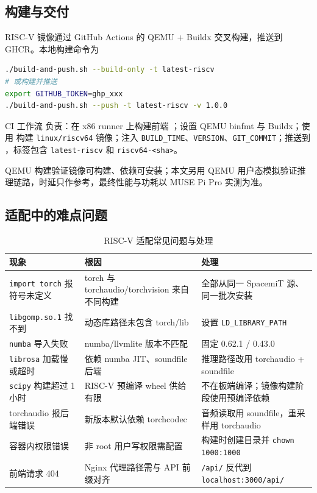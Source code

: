 \documentclass[UTF8,11pt,a4paper,fontset=none]{ctexart}
\begin{document}
\subsection{构建与交付}

RISC-V 镜像通过 GitHub Actions 的 QEMU + Buildx 交叉构建，推送到 GHCR。本地构建命令为

\begin{lstlisting}[language=bash,caption={RISC-V 镜像构建命令},label={lst:build}]
./build-and-push.sh --build-only -t latest-riscv
# 或构建并推送
export GITHUB_TOKEN=ghp_xxx
./build-and-push.sh --push -t latest-riscv -v 1.0.0
\end{lstlisting}

CI 工作流  负责：在 x86 runner 上构建前端 ；设置 QEMU binfmt 与 Buildx；使用  构建 \texttt{linux/riscv64} 镜像；注入 \texttt{BUILD\_TIME}、\texttt{VERSION}、\texttt{GIT\_COMMIT}；推送到 ，标签包含 \texttt{latest-riscv} 和 \texttt{riscv64-<sha>}。

QEMU 构建验证镜像可构建、依赖可安装；本文另用 QEMU 用户态模拟验证推理链路，时延只作参考，最终性能与功耗以 MUSE Pi Pro 实测为准。

\subsection{适配中的难点问题}

\begin{table}[H]
\centering
\small
\caption{RISC-V 适配常见问题与处理}
\label{tab:pitfalls}
\begin{tabular}{p{4.4cm}p{4.6cm}p{5.0cm}}
\toprule
现象 & 根因 & 处理 \\
\midrule
\texttt{import torch} 报符号未定义 & torch 与 torchaudio/torchvision 来自不同构建 & 全部从同一 SpacemiT 源、同一批次安装 \\
\texttt{libgomp.so.1} 找不到 & 动态库路径未包含 torch/lib & 设置 \texttt{LD\_LIBRARY\_PATH} \\
\texttt{numba} 导入失败 & numba/llvmlite 版本不匹配 & 固定 0.62.1 / 0.43.0 \\
\texttt{librosa} 加载慢或超时 & 依赖 numba JIT、soundfile 后端 & 推理路径改用 torchaudio + soundfile \\
\texttt{scipy} 构建超过 1 小时 & RISC-V 预编译 wheel 供给有限 & 不在板端编译；镜像构建阶段使用预编译依赖 \\
torchaudio 报后端错误 & 新版本默认依赖 torchcodec & 音频读取用 soundfile，重采样用 torchaudio \\
容器内权限错误 & 非 root 用户写权限需配置 & 构建时创建目录并 \texttt{chown 1000:1000} \\
前端请求 404 & Nginx 代理路径需与 API 前缀对齐 & \texttt{/api/} 反代到 \texttt{localhost:3000/api/} \\
\bottomrule
\end{tabular}
\end{table}
\end{document}
